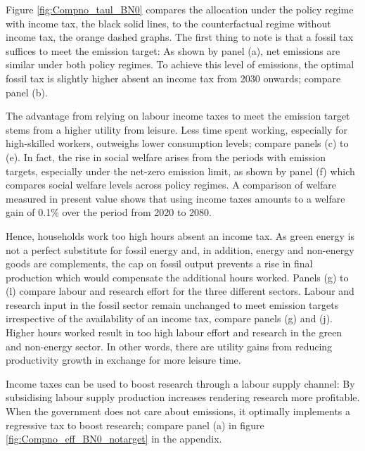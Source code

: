 Figure  \ref{fig:Compno_taul_BN0} compares the allocation under the policy regime with income tax, the black solid lines, to the counterfactual regime without income tax, the orange dashed graphs. 
The first thing to note is that a fossil tax suffices to meet the emission target: As shown by panel (a), net emissions are similar under both policy regimes. To achieve this level of emissions, the optimal fossil tax is slightly higher absent an income tax from 2030 onwards; compare panel (b).

The advantage from relying on labour income taxes to meet the emission target stems from a higher utility from leisure. Less time spent working, especially for high-skilled workers,  outweighs lower consumption levels; compare panels (c) to (e). In fact, the rise in social welfare arises from the periods with  emission targets, especially under the net-zero emission limit, as shown by panel (f) which compares social welfare levels across policy regimes. A comparison of welfare measured in present value  shows that using income taxes amounts to a welfare gain of 0.1\% over the period from 2020 to 2080.

Hence, households work too high hours absent an income tax. %
As green energy is not a perfect substitute for fossil energy and, in addition, energy and non-energy goods are complements, the cap on fossil output prevents a rise in final production which would compensate the additional hours worked. 
Panels (g) to (l) compare labour and research effort for the three different sectors. Labour and research input in the fossil sector remain unchanged to meet emission targets irrespective of the availability of an income tax, compare panels (g) and (j). Higher hours worked result in too high labour effort and research in the green and non-energy sector. In other words, there are utility gains from reducing productivity growth in exchange for more leisure time.

Income taxes can be used to boost research through a labour supply channel: By subsidising labour supply production increases rendering research more profitable. When the government does not care about emissions, it optimally implements a regressive tax to boost research; compare panel (a) in figure \ref{fig:Compno_eff_BN0_notarget} in the appendix. %



